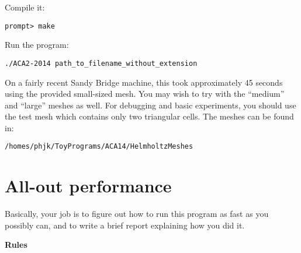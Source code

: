 \documentclass{article}
\begin{document}
Compile it:
\begin{verbatim}
prompt> make
\end{verbatim}
Run the program:
\begin{verbatim}
./ACA2-2014 path_to_filename_without_extension
\end{verbatim}
On a fairly recent Sandy Bridge machine, this took approximately 45 seconds using the provided small-sized mesh. You may wish to try with the ``medium'' and ``large'' meshes as well. For debugging and basic experiments, you should use the test mesh which contains only two triangular cells.
The meshes can be found in:
\begin{verbatim}
/homes/phjk/ToyPrograms/ACA14/HelmholtzMeshes
\end{verbatim}

\section*{All-out performance}

Basically, your job is to figure out how to run this program as fast as you possibly can, and to write a brief report explaining how you did it.

\textbf{Rules}
\end{document}
